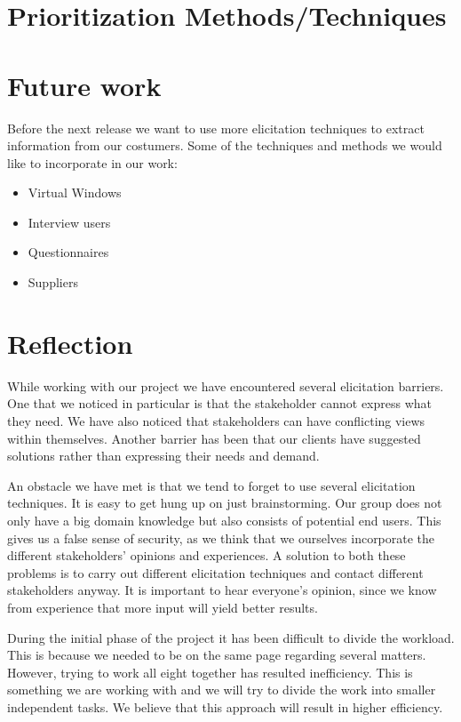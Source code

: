 \documentclass[a4paper]{article}
\begin{document}
	\section{Prioritization Methods/Techniques}

  \section{Future work}
Before the next release we want to use more elicitation techniques to extract
information from our costumers. Some of the techniques and methods we would
like to incorporate in our work:

  \begin{itemize}
  	\item Virtual Windows
  	\item Interview users
  	\item Questionnaires
  	\item Suppliers 
  \end{itemize}
 
  \section{Reflection}

While working with our project we have encountered several elicitation barriers. One that we noticed in particular is that the stakeholder cannot express what they need. We have also noticed that stakeholders can have conflicting views within themselves. Another barrier has been that our clients have suggested solutions rather than expressing their needs and demand.

An obstacle we have met is that we tend to forget to use several elicitation techniques. It is easy to get hung up on just brainstorming. Our group does not only have a big domain knowledge but also consists of potential end users. This gives us a false sense of security, as we think that we ourselves incorporate the different stakeholders' opinions and experiences. A solution to both these problems is to carry out different elicitation techniques and contact different stakeholders anyway. It is important to hear everyone's opinion, since we know from experience that more input will yield better results.

During the initial phase of the project it has been difficult to divide the workload. This is because we needed to be on the same page regarding several matters. However, trying to work all eight together has resulted inefficiency. This is something we are working with and we will try to divide the work into smaller independent tasks. We believe that this approach will result in higher efficiency.
\end{document}
